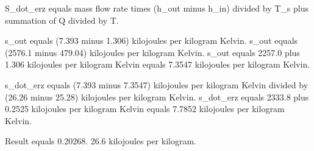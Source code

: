 S_dot_erz equals mass flow rate times (h_out minus h_in) divided by T_s plus summation of Q divided by T.  

s_out equals (7.393 minus 1.306) kilojoules per kilogram Kelvin.  
s_out equals (2576.1 minus 479.04) kilojoules per kilogram Kelvin.  
s_out equals 2257.0 plus 1.306 kilojoules per kilogram Kelvin equals 7.3547 kilojoules per kilogram Kelvin.  

s_dot_erz equals (7.393 minus 7.3547) kilojoules per kilogram Kelvin divided by (26.26 minus 25.28) kilojoules per kilogram Kelvin.  
s_dot_erz equals 2333.8 plus 0.2525 kilojoules per kilogram Kelvin equals 7.7852 kilojoules per kilogram Kelvin.  

Result equals 0.20268.  
26.6 kilojoules per kilogram.